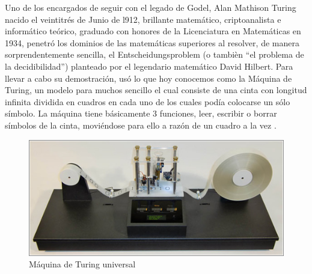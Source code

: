 \documentclass{article}
\begin{document}
Uno de los encargados de seguir con el legado de Godel, Alan Mathison Turing nacido el veintitrés de Junio de l912, brillante matemático, criptoanalista e informático teórico, graduado con honores de la Licenciatura en Matemáticas en 1934, penetró los dominios de las matemáticas superiores al resolver, de manera sorprendentemente sencilla, el Entscheidungsproblem (o tambièn “el problema de la decidibilidad”) planteado por el legendario matemático  David Hilbert. 
Para llevar a cabo su demostración, usó lo que hoy conocemos como la Máquina de Turing, un modelo para muchos  sencillo el cual consiste de una cinta con longitud infinita dividida en cuadros en cada uno de los cuales podía colocarse un sólo símbolo. La máquina tiene básicamente 3 funciones, leer, escribir o borrar símbolos de la cinta, moviéndose para ello a razón de un cuadro a la vez .                                                                                                                                                                                                                                                                                                   \begin{figure}[h!]
\centering
\includegraphics[scale=0.6]{turingFull560.jpg}
\caption{Máquina de Turing universal}
\label{fig:universe}
\end{figure}           
\end{document}
